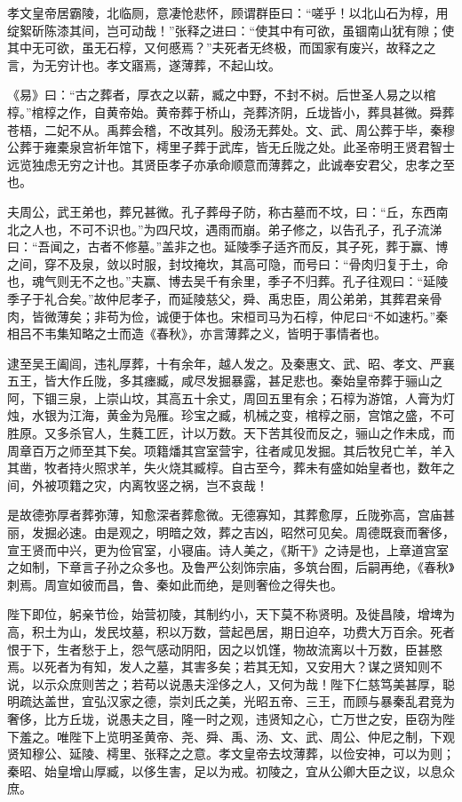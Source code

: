 \documentclass[12pt,UTF8]{ctexbook}
\begin{document}
孝文皇帝居霸陵，北临厕，意凄怆悲怀，顾谓群臣曰：“嗟乎！以北山石为椁，用绽絮斫陈漆其间，岂可动哉！”张释之进曰：“使其中有可欲，虽锢南山犹有隙；使其中无可欲，虽无石椁，又何慼焉？”夫死者无终极，而国家有废兴，故释之之言，为无穷计也。孝文寤焉，遂薄葬，不起山坟。



《易》曰：“古之葬者，厚衣之以薪，臧之中野，不封不树。后世圣人易之以棺椁。”棺椁之作，自黄帝始。黄帝葬于桥山，尧葬济阴，丘垅皆小，葬具甚微。舜葬苍梧，二妃不从。禹葬会稽，不改其列。殷汤无葬处。文、武、周公葬于毕，秦穆公葬于雍橐泉宫祈年馆下，樗里子葬于武库，皆无丘陇之处。此圣帝明王贤君智士远览独虑无穷之计也。其贤臣孝子亦承命顺意而薄葬之，此诚奉安君父，忠孝之至也。



夫周公，武王弟也，葬兄甚微。孔子葬母子防，称古墓而不坟，曰：“丘，东西南北之人也，不可不识也。”为四尺坟，遇雨而崩。弟子修之，以告孔子，孔子流涕曰：“吾闻之，古者不修墓。”盖非之也。延陵季子适齐而反，其子死，葬于赢、博之间，穿不及泉，敛以时服，封坟掩坎，其高可隐，而号曰：“骨肉归复于土，命也，魂气则无不之也。”夫赢、博去吴千有余里，季子不归葬。孔子往观曰：“延陵季子于礼合矣。”故仲尼孝子，而延陵慈父，舜、禹忠臣，周公弟弟，其葬君亲骨肉，皆微薄矣；非苟为俭，诚便于体也。宋桓司马为石椁，仲尼曰“不如速朽。”秦相吕不韦集知略之士而造《春秋》，亦言薄葬之义，皆明于事情者也。



逮至吴王阖闾，违礼厚葬，十有余年，越人发之。及秦惠文、武、昭、孝文、严襄五王，皆大作丘陇，多其瘗臧，咸尽发掘暴露，甚足悲也。秦始皇帝葬于骊山之阿，下锢三泉，上崇山坟，其高五十余丈，周回五里有余；石椁为游馆，人膏为灯烛，水银为江海，黄金为凫雁。珍宝之臧，机械之变，棺椁之丽，宫馆之盛，不可胜原。又多杀官人，生蕤工匠，计以万数。天下苦其役而反之，骊山之作未成，而周章百万之师至其下矣。项籍燔其宫室营宇，往者咸见发掘。其后牧兒亡羊，羊入其凿，牧者持火照求羊，失火烧其臧椁。自古至今，葬未有盛如始皇者也，数年之间，外被项籍之灾，内离牧竖之祸，岂不哀哉！



是故德弥厚者葬弥薄，知愈深者葬愈微。无德寡知，其葬愈厚，丘陇弥高，宫庙甚丽，发掘必速。由是观之，明暗之效，葬之吉凶，昭然可见矣。周德既衰而奢侈，宣王贤而中兴，更为俭官室，小寝庙。诗人美之，《斯干》之诗是也，上章道宫室之如制，下章言子孙之众多也。及鲁严公刻饰宗庙，多筑台囿，后嗣再绝，《春秋》刺焉。周宣如彼而昌，鲁、秦如此而绝，是则奢俭之得失也。



陛下即位，躬亲节俭，始营初陵，其制约小，天下莫不称贤明。及徙昌陵，增埤为高，积土为山，发民坟墓，积以万数，营起邑居，期日迫卒，功费大万百余。死者恨于下，生者愁于上，怨气感动阴阳，因之以饥馑，物故流离以十万数，臣甚愍焉。以死者为有知，发人之墓，其害多矣；若其无知，又安用大？谋之贤知则不说，以示众庶则苦之；若苟以说愚夫淫侈之人，又何为哉！陛下仁慈笃美甚厚，聪明疏达盖世，宜弘汉家之德，崇刘氏之美，光昭五帝、三王，而顾与暴秦乱君竞为奢侈，比方丘垅，说愚夫之目，隆一时之观，违贤知之心，亡万世之安，臣窃为陛下羞之。唯陛下上览明圣黄帝、尧、舜、禹、汤、文、武、周公、仲尼之制，下观贤知穆公、延陵、樗里、张释之之意。孝文皇帝去坟薄葬，以俭安神，可以为则；秦昭、始皇增山厚臧，以侈生害，足以为戒。初陵之，宜从公卿大臣之议，以息众庶。
\end{document}
